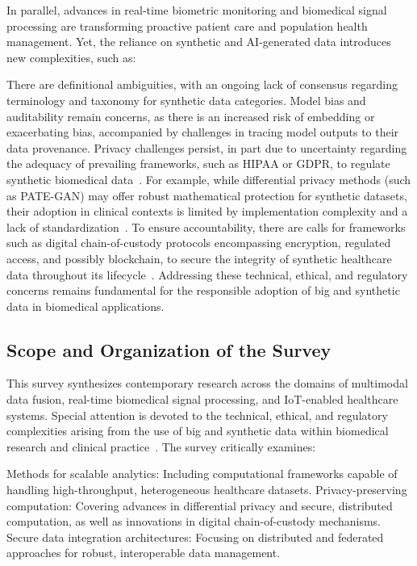 \documentclass[sigconf]{acmart}
\begin{document}
In parallel, advances in real-time biometric monitoring and biomedical signal processing are transforming proactive patient care and population health management. Yet, the reliance on synthetic and AI-generated data introduces new complexities, such as:

There are definitional ambiguities, with an ongoing lack of consensus regarding terminology and taxonomy for synthetic data categories. Model bias and auditability remain concerns, as there is an increased risk of embedding or exacerbating bias, accompanied by challenges in tracing model outputs to their data provenance. Privacy challenges persist, in part due to uncertainty regarding the adequacy of prevailing frameworks, such as HIPAA or GDPR, to regulate synthetic biomedical data~\cite{ref91}. For example, while differential privacy methods (such as PATE-GAN) may offer robust mathematical protection for synthetic datasets, their adoption in clinical contexts is limited by implementation complexity and a lack of standardization~\cite{ref91}. To ensure accountability, there are calls for frameworks such as digital chain-of-custody protocols encompassing encryption, regulated access, and possibly blockchain, to secure the integrity of synthetic healthcare data throughout its lifecycle~\cite{ref91}. Addressing these technical, ethical, and regulatory concerns remains fundamental for the responsible adoption of big and synthetic data in biomedical applications.

\subsection{Scope and Organization of the Survey}

This survey synthesizes contemporary research across the domains of multimodal data fusion, real-time biomedical signal processing, and IoT-enabled healthcare systems. Special attention is devoted to the technical, ethical, and regulatory complexities arising from the use of big and synthetic data within biomedical research and clinical practice~\cite{ref91,ref92,ref106}. The survey critically examines:

Methods for scalable analytics: Including computational frameworks capable of handling high-throughput, heterogeneous healthcare datasets.
Privacy-preserving computation: Covering advances in differential privacy and secure, distributed computation, as well as innovations in digital chain-of-custody mechanisms.
Secure data integration architectures: Focusing on distributed and federated approaches for robust, interoperable data management.
\end{document}
